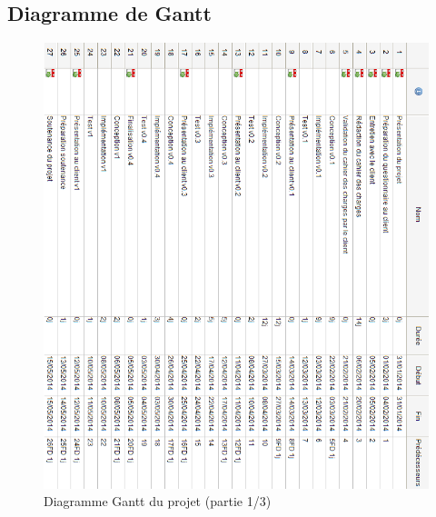 \documentclass[a4paper, 12pt, twoside]{article}
\begin{document}
\newpage
\restoregeometry



\newpage\thispagestyle{empty}

\subsection{Diagramme de Gantt}%

\begin{figure}[h]
  \center
  \includegraphics[scale=0.71]{diag_gant1.png}
  \caption{Diagramme Gantt du projet (partie 1/3)}
  \label{diagGant1}
\end{figure}
\end{document}

